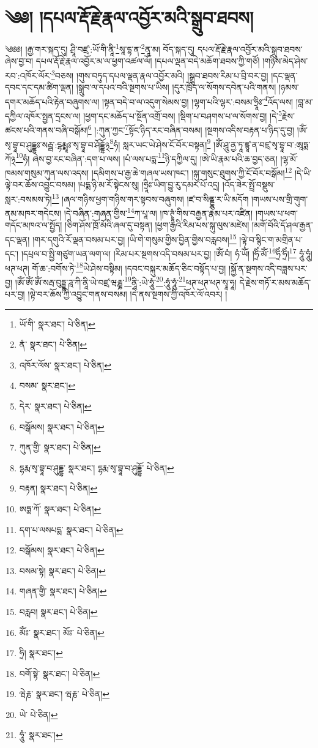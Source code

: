 \setcounter{footnote}{0} 
\chapter{༄༅། །དཔལ་རྡོ་རྗེ་རྣལ་འབྱོར་མའི་སྒྲུབ་ཐབས།}༄༅༅། །རྒྱ་གར་སྐད་དུ། ཤྲཱི་བཛྲ་:ཡོ་གི་ནཱི་\footnote{ཡོ་གི་  སྣར་ཐང་།  པེ་ཅིན། }སཱ་དྷ་ན་\footnote{ནཾ་  སྣར་ཐང་།  པེ་ཅིན། }ནཱ་མ། བོད་སྐད་དུ། དཔལ་རྡོ་རྗེ་རྣལ་འབྱོར་མའི་སྒྲུབ་ཐབས་ཞེས་བྱ་བ། དཔལ་རྡོ་རྗེ་རྣལ་འབྱོར་མ་ལ་ཕྱག་འཚལ་ལོ། །དཔལ་ལྡན་བདེ་མཆོག་ཐབས་ཀྱི་གཙོ། །གཉིས་མེད་ཤེས་རབ་:འཁོར་ལོར་\footnote{འཁོར་ལོས་  སྣར་ཐང་།  པེ་ཅིན། }བཅས། །གུས་བཏུད་དཔལ་ལྡན་རྣལ་འབྱོར་མའི། །སྒྲུབ་ཐབས་རིམ་པ་བྲི་བར་བྱ། །དང་ལྡན་དབང་དང་དམ་ཚིག་ལྡན། །སྒྲུབ་ལ་དཔའ་བའི་སྔགས་པ་ཡིས། །དུར་ཁྲོད་ལ་སོགས་དབེན་པའི་གནས། །ཉམས་དགར་མཆོད་པའི་རྟེན་བཞུགས་ལ། །སྟན་བདེ་བ་ལ་འདུག་སེམས་བྱ། །ལྷག་པའི་ལྷར་:བསམ་ཧྲཱིཿ་\footnote{བསམ་  སྣར་ཐང་། }འོད་ལས། །བླ་མ་དཀྱིལ་འཁོར་སྤྱན་དྲངས་ལ། །ཕྱག་དང་མཆོད་པ་སྔོན་འགྲོ་བས། །སྡིག་པ་བཤགས་པ་ལ་སོགས་བྱ། །དེ་\footnote{དེར་  སྣར་ཐང་།  པེ་ཅིན། }རྗེས་ཚངས་པའི་གནས་བཞི་བསྒོམ།\footnote{བསྒོམས།  སྣར་ཐང་།  པེ་ཅིན། } །:ཀུན་ཀྱང་\footnote{ཀུན་གྱི་  སྣར་ཐང་།  པེ་ཅིན། }སྟོང་ཉིད་རང་བཞིན་བསམ། །སྔགས་འདིས་བརྟན་པ་ཉིད་དུ་བྱ། །ཨོཾ་སྭ་བྷཱ་བ་ཤུདྡྷཿ་སརྦྦ་:དྷརྨྨཱཿ་སྭ་བྷཱ་བ་ཤོདྡྷོ྅\footnote{དྷརྨ་སྭ་བྷཱ་བ་ཤུདྡྷ་  སྣར་ཐང་། དྷརྨ་སྭ་བྷཱ་བ་ཤུདྡྷོ་  པེ་ཅིན། }ཧཾ། སླར་ཡང་ཡེ་ཤེས་ངོ་བོར་བསྟན།\footnote{བརྟན།  སྣར་ཐང་།  པེ་ཅིན། } །ཨོཾ་ཤཱུ་ནྱ་ཏཱ་ཛྙཱ་ན་བཛྲ་སྭ་བྷཱ་བ་:ཨཱཏྨ་ཀོ྅\footnote{ཨཏྨ་ཀོ་  སྣར་ཐང་།  པེ་ཅིན། }ཧཾ། ཞེས་བྱ་རང་བཞིན་:དག་པ་ལས། །པཾ་ལས་པདྨ་\footnote{དག་པ་ལསཔདྨ་  སྣར་ཐང་།  པེ་ཅིན། }ཉི་དཀྱིལ་དུ། །ཨེ་ཡི་རྣམ་པའི་ཆ་བྱད་ཅན། །ལྷ་མོ་ཁམས་གསུམ་ཀུན་ལས་འདས། །དམིགས་པ་རྒྱ་ཆེ་གཞལ་ཡས་ཁང་། །སྐུ་གསུང་ཐུགས་ཀྱི་ངོ་བོར་བསྒོམ།\footnote{བསྒོམས།  སྣར་ཐང་།  པེ་ཅིན། } །དེ་ཡི་ལྟེ་བར་ཆོས་འབྱུང་བསམ། །པདྨ་ཉི་མ་རོ་སྟེངས་སུ། །ཧྲཱིཿ་ཡིག་བྱུ་རུ་དམར་པོ་འདྲ། །འོད་ཟེར་སྤྲོ་བསྡུས་སླར་:བསམས་ཏེ།\footnote{བསམ་སྟེ།  སྣར་ཐང་།  པེ་ཅིན། } །ཞལ་གཉིས་ཕྱག་གཉིས་གར་སྟབས་བཞུགས། །ཛ་བ་སིནྡྷུ་ར་ཡི་མདོག །གཡས་པས་གྲི་གུག་ནམ་མཁར་གདེངས། །དེ་བཞིན་:གཞན་གྱིས་\footnote{གཞན་གྱི་  སྣར་ཐང་།  པེ་ཅིན། }ཀ་པཱ་ལ། །ཁ་ཊྭཱཾ་གིས་བརྒྱན་རྣམ་པར་འཛིན། །གཡས་པ་ཕག་གདོང་མཁའ་ལ་སྤྱོད། །ཅིག་ཤོས་ཁྲོ་མོའི་ཞལ་དུ་བསྟན། །ཕྱག་རྒྱའི་རིམ་པས་སྐུ་ལུས་མཛེས། །མགོ་བོའི་དོ་ཤལ་རྒྱན་དང་ལྡན། །གར་དགུའི་རོ་ལྡན་བསམ་པར་བྱ། །ཡི་གེ་གསུམ་གྱིས་བྱིན་གྱིས་བརླབས།\footnote{བརླབ།  སྣར་ཐང་།  པེ་ཅིན། } །ལྟེ་བ་སྙིང་ག་མགྲིན་པ་དང་། །དཔྲལ་བ་སྤྱི་གཙུག་ཡན་ལག་ལ། །རིམ་པར་སྔགས་འདི་བསམ་པར་བྱ། །ཨོཾ་བཾ། ཧཾ་ཡོཾ། །ཧྲིཾ་མོཾ་\footnote{མོཾཿ་  སྣར་ཐང་། མོཿ་  པེ་ཅིན། }ཧྲིཾ་ཧྲིཾ།\footnote{ཧྲི།  སྣར་ཐང་། } ཧཱུཾ་ཧཱུཾ། ཕཊ་ཕཊ། གོ་ཆ་:བགོས་ཏེ་\footnote{བགོ་སྟེ་  སྣར་ཐང་།  པེ་ཅིན། }ཡེ་ཤེས་བསྟིམ། །དབང་བསྐུར་མཆོད་ཅིང་བསྟོད་པ་བྱ། །སྐྱོ་ན་སྔགས་འདི་བཟླས་པར་བྱ། །ཨོཾ་ཨོཾ་ཨོཾ་སརྦ་བུདྡྷ་ཌཱ་ཀི་ནཱི་ཡེ་བཛྲ་ཝརྞྞ་\footnote{ཝེརྞ་  སྣར་ཐང་། ཝརྞ་  པེ་ཅིན། }ནཱི་:ཡེ་ཧཱུཾ་\footnote{ཡེ་  པེ་ཅིན། }:ཧཱུཾ་ཧཱུཾ་\footnote{ཧཱུཾ་  སྣར་ཐང་། }ཕཊ་ཕཊ་ཕཊ་སྭཱ་ཧཱ། དེ་རྗེས་གཏོ་ར་མས་མཆོད་པར་བྱ། །ལྟེ་བར་ཆོས་ཀྱི་འབྱུང་གནས་བསམ། །དེ་ནས་སྔགས་ཀྱི་འཁོར་ལོ་འབར། །
